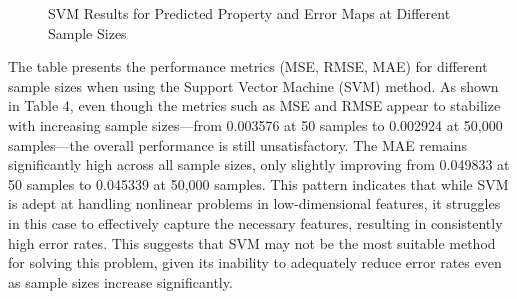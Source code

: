 \documentclass{swmcmthesis}
\begin{document}
\begin{figure}[h!t]

\caption{SVM Results for Predicted Property and Error Maps at Different Sample Sizes}
\label{fig:all_results}
\end{figure}

The table presents the performance metrics (MSE, RMSE, MAE) for different sample sizes when using the Support Vector Machine (SVM) method. As shown in Table 4, even though the metrics such as MSE and RMSE appear to stabilize with increasing sample sizes—from 0.003576 at 50 samples to 0.002924 at 50,000 samples—the overall performance is still unsatisfactory. The MAE remains significantly high across all sample sizes, only slightly improving from 0.049833 at 50 samples to 0.045339 at 50,000 samples. This pattern indicates that while SVM is adept at handling nonlinear problems in low-dimensional features, it struggles in this case to effectively capture the necessary features, resulting in consistently high error rates. This suggests that SVM may not be the most suitable method for solving this problem, given its inability to adequately reduce error rates even as sample sizes increase significantly.
\end{document}
